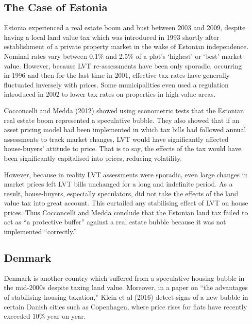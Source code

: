 \documentclass[]{tufte-handout}
\begin{document}
\hypertarget{the-case-of-estonia}{%
\subsection{The Case of Estonia}\label{the-case-of-estonia}}

Estonia experienced a real estate boom and bust between 2003 and 2009,
despite having a local land value tax which was introduced in 1993
shortly after establishment of a private property market in the wake of
Estonian independence. Nominal rates vary between 0.1\% and 2.5\% of a
plot's `highest' or `best' market value. However, because LVT
re-assessments have been only sporadic, occurring in 1996 and then for
the last time in 2001, effective tax rates have generally fluctuated
inversely with prices. Some municipalities even used a regulation
introduced in 2002 to lower tax rates on properties in high value areas.

Cocconcelli and Medda (2012) showed using econometric tests that the
Estonian real estate boom represented a speculative bubble. They also
showed that if an asset pricing model had been implemented in which tax
bills had followed annual assessments to track market changes, LVT would
have significantly affected house-buyers' attitude to price. That is to
say, the effects of the tax would have been significantly capitalised
into prices, reducing volatility.

However, because in reality LVT assessments were sporadic, even large
changes in market prices left LVT bills unchanged for a long and
indefinite period. As a result, house-buyers, especially speculators,
did not take the effects of the land value tax into great account. This
curtailed any stabilising effect of LVT on house prices. Thus
Cocconcelli and Medda conclude that the Estonian land tax failed to act
as ``a protective buffer'' against a real estate bubble because it was
not implemented ``correctly.''

\hypertarget{denmark}{%
\subsection{Denmark}\label{denmark}}

Denmark is another country which suffered from a speculative housing
bubble in the mid-2000s despite taxing land value. Moreover, in a paper
on ``the advantages of stabilising housing taxation,'' Klein et al
(2016) detect signs of a new bubble in certain Danish cities such as
Copenhagen, where price rises for flats have recently exceeded 10\%
year-on-year.
\end{document}
